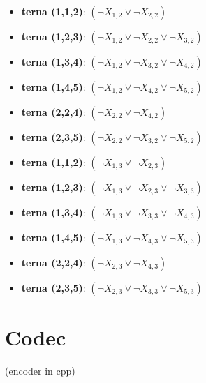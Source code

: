 \documentclass[10pt]{article}
\begin{document}
\begin{enumerate}
\begin{itemize}
    \item \textbf{terna (1,1,2)}: $(\neg X_{1,2} \lor \neg X_{2,2})$
    \item \textbf{terna (1,2,3)}: $(\neg X_{1,2} \lor \neg X_{2,2} \lor \neg X_{3,2})$
    \item \textbf{terna (1,3,4)}: $(\neg X_{1,2} \lor \neg X_{3,2} \lor \neg X_{4,2})$
    \item \textbf{terna (1,4,5)}: $(\neg X_{1,2} \lor \neg X_{4,2} \lor \neg X_{5,2})$    
    \item \textbf{terna (2,2,4)}: $(\neg X_{2,2} \lor \neg X_{4,2})$
    \item \textbf{terna (2,3,5)}: $(\neg X_{2,2} \lor \neg X_{3,2} \lor \neg X_{5,2})$
\end{itemize}

\begin{itemize}
    \item \textbf{terna (1,1,2)}: $(\neg X_{1,3} \lor \neg X_{2,3})$
    \item \textbf{terna (1,2,3)}: $(\neg X_{1,3} \lor \neg X_{2,3} \lor \neg X_{3,3})$
    \item \textbf{terna (1,3,4)}: $(\neg X_{1,3} \lor \neg X_{3,3} \lor \neg X_{4,3})$
    \item \textbf{terna (1,4,5)}: $(\neg X_{1,3} \lor \neg X_{4,3} \lor \neg X_{5,3})$
    \item \textbf{terna (2,2,4)}: $(\neg X_{2,3} \lor \neg X_{4,3})$    
    \item \textbf{terna (2,3,5)}: $(\neg X_{2,3} \lor \neg X_{3,3} \lor \neg X_{5,3})$
\end{itemize}

\end{enumerate}

\section{Codec}
(encoder in cpp)
\end{document}
